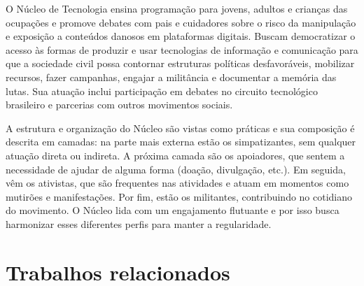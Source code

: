 O Núcleo de Tecnologia ensina programação para jovens, adultos e crianças das ocupações e promove debates com pais e cuidadores sobre o risco da manipulação e exposição a conteúdos danosos em plataformas digitais. Buscam democratizar o acesso às formas de produzir e usar tecnologias de informação e comunicação para que a sociedade civil possa contornar estruturas políticas desfavoráveis, mobilizar recursos, fazer campanhas, engajar a militância e documentar a memória das lutas. Sua atuação inclui participação em debates no circuito tecnológico brasileiro e parcerias com outros movimentos sociais.

A estrutura e organização do Núcleo são vistas como práticas e sua composição é descrita em camadas: na parte mais externa estão os simpatizantes, sem qualquer atuação direta ou indireta. A próxima camada são os apoiadores, que sentem a necessidade de ajudar de alguma forma (doação, divulgação, etc.). Em seguida, vêm os ativistas, que são frequentes nas atividades e atuam em momentos como mutirões e manifestações. Por fim, estão os militantes, contribuindo no cotidiano do movimento. O Núcleo lida com um engajamento flutuante e por isso busca harmonizar esses diferentes perfis para manter a regularidade.

\section{Trabalhos relacionados}
\label{sec:trabalhosrelacionados}

